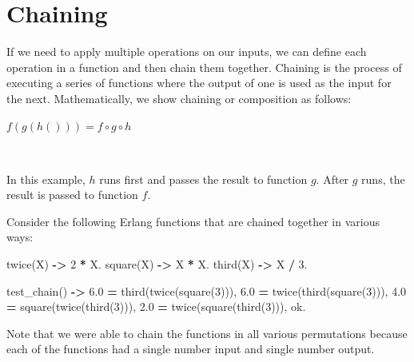 \documentclass[
]{book}
\newenvironment{Shaded}{\begin{snugshade}}{\end{snugshade}}
\newcommand{\CharTok}[1]{\textcolor[rgb]{0.31,0.60,0.02}{#1}}
\newcommand{\DecValTok}[1]{\textcolor[rgb]{0.00,0.00,0.81}{#1}}
\newcommand{\FloatTok}[1]{\textcolor[rgb]{0.00,0.00,0.81}{#1}}
\newcommand{\FunctionTok}[1]{\textcolor[rgb]{0.00,0.00,0.00}{#1}}
\newcommand{\OperatorTok}[1]{\textcolor[rgb]{0.81,0.36,0.00}{\textbf{#1}}}
\newcommand{\VariableTok}[1]{\textcolor[rgb]{0.00,0.00,0.00}{#1}}
\begin{document}
\hypertarget{chaining}{%
\section{Chaining}\label{chaining}}

If we need to apply multiple operations on our inputs, we can define each operation in a function and then chain them together. Chaining is the process of executing a series of functions where the output of one is used as the input for the next. Mathematically, we show chaining or composition as follows:

\begin{formulabox}
\(\mathit{f}(g(h())) = \mathit{f} \circ g \circ h\)

\end{formulabox}

\(\nonumber\)

In this example, \(h\) runs first and passes the result to function \(g\). After \(g\) runs, the result is passed to function \(\mathit{f}\).

Consider the following Erlang functions that are chained together in various ways:

\begin{Shaded}
\begin{Highlighting}[]
\FunctionTok{twice(}\VariableTok{X}\FunctionTok{)} \OperatorTok{{-}\textgreater{}} \DecValTok{2} \OperatorTok{*} \VariableTok{X}\FunctionTok{.}
\FunctionTok{square(}\VariableTok{X}\FunctionTok{)} \OperatorTok{{-}\textgreater{}} \VariableTok{X} \OperatorTok{*} \VariableTok{X}\FunctionTok{.}
\FunctionTok{third(}\VariableTok{X}\FunctionTok{)} \OperatorTok{{-}\textgreater{}} \VariableTok{X} \OperatorTok{/} \DecValTok{3}\FunctionTok{.}

\FunctionTok{test\_chain()} \OperatorTok{{-}\textgreater{}}
    \FloatTok{6.0} \OperatorTok{=} \FunctionTok{third(twice(square(}\DecValTok{3}\FunctionTok{))),}
    \FloatTok{6.0} \OperatorTok{=} \FunctionTok{twice(third(square(}\DecValTok{3}\FunctionTok{))),}
    \FloatTok{4.0} \OperatorTok{=} \FunctionTok{square(twice(third(}\DecValTok{3}\FunctionTok{))),}
    \FloatTok{2.0} \OperatorTok{=} \FunctionTok{twice(square(third(}\DecValTok{3}\FunctionTok{))),}
    \CharTok{ok}\FunctionTok{.}
\end{Highlighting}
\end{Shaded}

Note that we were able to chain the functions in all various permutations because each of the functions had a single number input and single number output.
\end{document}

